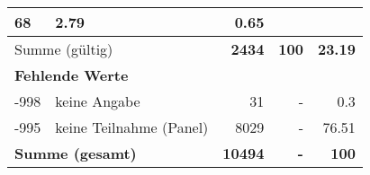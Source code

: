 \begin{longtable}{lXrrr}
       \num{68} &
       \num[round-mode=places,round-precision=2]{2,79} &
         \num[round-mode=places,round-precision=2]{0,65} \\
     \midrule
     \multicolumn{2}{l}{Summe (gültig)} &
       \textbf{\num{2434}} &
     \textbf{100} &
       \textbf{\num[round-mode=places,round-precision=2]{23,19}} \\
     \multicolumn{5}{l}{\textbf{Fehlende Werte}}\\
       -998 &
       keine Angabe &
         \num{31} &
        - &
         \num[round-mode=places,round-precision=2]{0,3} \\
       -995 &
       keine Teilnahme (Panel) &
         \num{8029} &
        - &
         \num[round-mode=places,round-precision=2]{76,51} \\
     \midrule
     \multicolumn{2}{l}{\textbf{Summe (gesamt)}} &
          \textbf{\num{10494}} &
        \textbf{-} &
        \textbf{100} \\
     \bottomrule
     \end{longtable}
     
